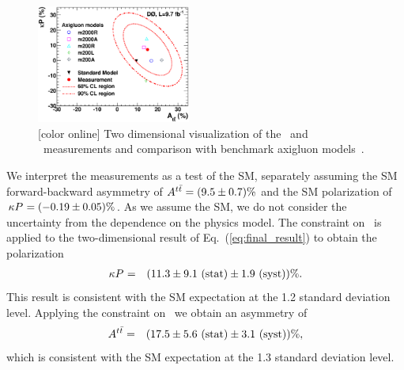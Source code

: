 \documentclass[aps,prd,twocolumn,showpacs,superscriptaddress,groupedaddress,floatfix]{revtex4}
\begin{document}
\begin{figure}[!htb]
\center

\includegraphics[width=0.45\textwidth]{afb_polar_measurement_statsyst_bsm.eps}


\caption{\label{fig:2d_result_afb_polar} [color online]
Two dimensional visualization of the \Att\ and \Ptt\ measurements and comparison with benchmark axigluon models~\cite{Carmona:2014gra}.}
\end{figure}




We interpret the measurements as a test of the SM, separately assuming 
the SM forward-backward asymmetry of  $A^{t\bar t}=(9.5\pm0.7) \%$
and the SM polarization of $\kappa P^{}_{}= (-0.19 \pm 0.05) \%$.
As we assume the SM, we do not consider the
uncertainty from the dependence on the physics model.
The  constraint on \Att\ is applied to the two-dimensional result of Eq.~(\ref{eq:final_result}) to obtain the polarization
\begin{eqnarray}
\kappa P^{}_{} &=& (11.3 \pm 9.1 \text{ (stat)}  \pm 1.9 \text{ (syst)})\%.
\label{eq:Ptt_only_result}  \end{eqnarray}
This result is consistent with the SM expectation at the 1.2 standard deviation level.
Applying  the constraint on \Ptt\ we  obtain an asymmetry of
\begin{eqnarray}
A^{t\bar t} &=& (17.5 \pm 5.6 \text{ (stat)}  \pm 3.1 \text{ (syst)})\%,
\label{eq:Att_only_result}  \end{eqnarray}
which is consistent with  the SM expectation at the 1.3 standard deviation level.
\end{document}
